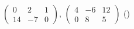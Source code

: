$\begin{pmatrix} 0 & 2 & 1 \\ 14 & -7 & 0 \end{pmatrix}$, $\begin{pmatrix} 4 & -6 & 12 \\ 0 & 8 & 5 \end{pmatrix}$ \hfill (\hspace*{2.4em})
